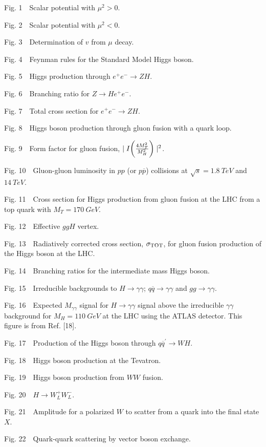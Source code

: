 Fig. 1~~Scalar potential with $\mu^2>0$.

Fig. 2~~Scalar potential with $\mu^2<0$.

Fig. 3~~Determination of $v$ from $\mu$ decay.

Fig. 4~~Feynman rules for the Standard Model Higgs boson.

Fig. 5~~Higgs production through $e^+e^- \rightarrow Z H$.

Fig. 6~~Branching ratio for $Z\rightarrow H e^+e^-$.

Fig. 7~~Total cross section for $e^+e^- \rightarrow ZH$.

Fig. 8~~Higgs boson production through gluon fusion with a quark loop.

Fig. 9~~Form factor for gluon fusion, $\mid I\biggl(
{ 4M_T^2\over M_H^2}\biggr)\mid^2$.

Fig. 10~~Gluon-gluon luminosity in $pp$ (or $ p
{\overline p}$) collisions at $\sqrt{s}=1.8~TeV$ and $14~TeV$.

Fig. 11~~Cross section for Higgs production
from gluon fusion
at the LHC from a top quark with $M_T=170~GeV$.


Fig. 12~~Effective $ggH$ vertex.

Fig. 13~~Radiatively corrected cross section, $\sigma_{\rm TOT}$,
 for gluon
fusion production of the Higgs boson at the LHC.

Fig. 14~~Branching ratios for the intermediate mass Higgs boson.

Fig. 15~~Irreducible backgrounds to $H\rightarrow \gamma\gamma$;
$q {\overline q} \rightarrow \gamma\gamma$ and $g g \rightarrow
\gamma\gamma$.

Fig. 16~~Expected $M_{\gamma \gamma}$ signal for $H\rightarrow \gamma
\gamma$ signal above the irreducible $\gamma \gamma$ background
for $M_H=110~GeV$ at the LHC using the ATLAS detector.  This figure
is from Ref. [18].

Fig. 17~~Production of the Higgs boson through $q \overline{q}^{\prime}
\rightarrow W H$.

Fig. 18~~Higgs boson production at the Tevatron.

Fig. 19~~Higgs boson production from $WW$ fusion.

Fig. 20~~$H\rightarrow W^+_LW^-_L$.

Fig. 21~~Amplitude for a polarized $W$ to scatter
from a quark into the final state $X$.

Fig. 22~~Quark-quark scattering by vector boson exchange.

